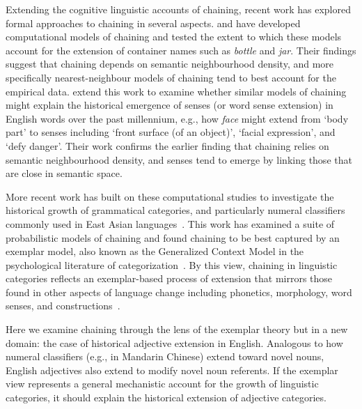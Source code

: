 \documentclass[output=paper]{langsci/langscibook}
\begin{document}
Extending the cognitive linguistic accounts of chaining, recent work has explored formal approaches to chaining in several aspects. \citet{sloman} and \citet{xu2016} have developed computational models of chaining and tested the extent to which these models account for the extension of container names such as \textit{bottle} and \textit{jar}. Their findings suggest that chaining depends on semantic neighbourhood density, and more specifically nearest-neighbour models of chaining tend to best account for the empirical data. \citet{ramiro2018} extend this work to examine whether similar models of chaining might explain the historical emergence of senses (or word sense extension) in English words over the past millennium, e.g., how \textit{face} might extend from `body part' to senses including `front surface (of an object)', `facial expression', and `defy danger'. Their work confirms the earlier finding that chaining relies on semantic neighbourhood density, and senses tend to emerge by linking those that are close in semantic space. 


More recent work has built on these computational studies to investigate the historical growth of grammatical categories, and particularly numeral classifiers commonly used in East Asian languages~\citep{habibi}. This work has examined a suite of probabilistic models of chaining and found chaining to be best captured by an exemplar model, also known as the Generalized Context Model in the psychological literature of categorization~\citep{nosofsky1986}. By this view, chaining in linguistic categories reflects an exemplar-based process of extension that mirrors those found in other aspects of language change including phonetics, morphology, word senses, and constructions~\citep{skousen89,pierrehumbert2001exemplar,keuleers08,bybee2013usage,ramsey17}.




Here we examine chaining through the lens of the exemplar theory but in a new domain: the case of historical adjective extension in English. Analogous to how numeral classifiers (e.g., in Mandarin Chinese) extend toward novel nouns, English adjectives also extend to modify novel noun referents. If the exemplar view represents a general mechanistic account for the growth of linguistic categories, it should explain the historical extension of adjective categories.
\end{document}
